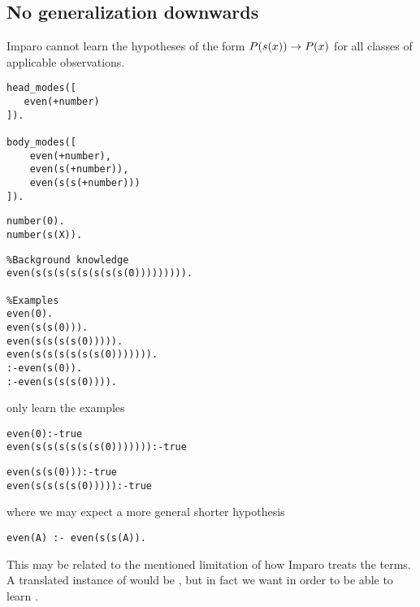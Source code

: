 \subsection{No generalization downwards}\label{imparo_no_generalization_downwards}
Imparo cannot learn the hypotheses of the form $P(s(x)) \to P(x)$ for all classes of applicable observations.

\begin{minipage}[t]{.25\textwidth}
\begin{lstlisting}
head_modes([
   even(+number)
]).

body_modes([
    even(+number),
    even(s(+number)),
    even(s(s(+number)))
]).
\end{lstlisting}
\end{minipage}
\begin{minipage}[t]{.20\textwidth}
\begin{lstlisting}
number(0).
number(s(X)).

\end{lstlisting}
\end{minipage}
\begin{minipage}[t]{.25\textwidth}
\begin{lstlisting}
%Background knowledge
even(s(s(s(s(s(s(s(s(0))))))))).

%Examples
even(0).
even(s(s(0))).
even(s(s(s(s(0))))).
even(s(s(s(s(s(s(0))))))).
:-even(s(0)).
:-even(s(s(s(0)))).
\end{lstlisting}
\end{minipage}


only learn the examples

\begin{minipage}[t]{.45\textwidth}
\begin{lstlisting}
even(0):-true
even(s(s(s(s(s(s(0))))))):-true
\end{lstlisting}
\end{minipage}
\begin{minipage}[t]{.20\textwidth}
\begin{lstlisting}
even(s(s(0))):-true
even(s(s(s(s(0))))):-true
\end{lstlisting}
\end{minipage}


where we may expect a more general shorter hypothesis

\begin{lstlisting}
even(A) :- even(s(s(A)).
\end{lstlisting}
This may be related to the mentioned limitation of how Imparo treats the terms. A translated instance of  would be
, but in fact we want  in order to be able to learn
.

